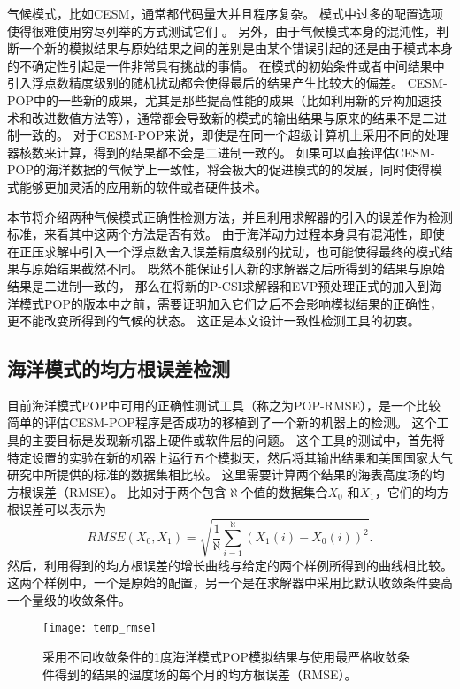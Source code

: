   
气候模式，比如CESM，通常都代码量大并且程序复杂。 
模式中过多的配置选项使得很难使用穷尽列举的方式测试它们 \cite{clune2011, pipitone2012}。 
另外，由于气候模式本身的混沌性，判断一个新的模拟结果与原始结果之间的差别是由某个错误引起的还是由于模式本身的不确定性引起是一件非常具有挑战的事情。 
在模式的初始条件或者中间结果中引入浮点数精度级别的随机扰动都会使得最后的结果产生比较大的偏差。
CESM-POP中的一些新的成果，尤其是那些提高性能的成果（比如利用新的异构加速技术和改进数值方法等），通常都会导致新的模式的输出结果与原来的结果不是二进制一致的。 
对于CESM-POP来说，即使是在同一个超级计算机上采用不同的处理器核数来计算，得到的结果都不会是二进制一致的。 
如果可以直接评估CESM-POP的海洋数据的气候学上一致性，将会极大的促进模式的的发展，同时使得模式能够更加灵活的应用新的软件或者硬件技术。 

本节将介绍两种气候模式正确性检测方法，并且利用求解器的引入的误差作为检测标准，来看其中这两个方法是否有效。
由于海洋动力过程本身具有混沌性，即使在正压求解中引入一个浮点数舍入误差精度级别的扰动，也可能使得最终的模式结果与原始结果截然不同。 
既然不能保证引入新的求解器之后所得到的结果与原始结果是二进制一致的，
那么在将新的P-CSI求解器和EVP预处理正式的加入到海洋模式POP的版本中之前，需要证明加入它们之后不会影响模拟结果的正确性，更不能改变所得到的气候的状态。
这正是本文设计一致性检测工具的初衷。 


\subsection{海洋模式的均方根误差检测}
\label{verify:premethod}
 

目前海洋模式POP中可用的正确性测试工具（称之为POP-RMSE），是一个比较简单的评估CESM-POP程序是否成功的移植到了一个新的机器上的检测。 
这个工具的主要目标是发现新机器上硬件或软件层的问题。 
这个工具的测试中，首先将特定设置的实验在新的机器上运行五个模拟天，然后将其输出结果和美国国家大气研究中所提供的标准的数据集相比较。
这里需要计算两个结果的海表高度场的均方根误差（RMSE）。 
比如对于两个包含$\aleph$个值的数据集合$X_0$ 和$X_1$，它们的均方根误差可以表示为
 \begin{equation*}
 RMSE(X_0, X_1) = \sqrt{\frac{1}{\aleph}\sum_{i=1}^\aleph(X_1(i)-X_0(i))^2}.
 \end{equation*}
然后，利用得到的均方根误差的增长曲线与给定的两个样例所得到的曲线相比较。 
这两个样例中，一个是原始的配置，另一个是在求解器中采用比默认收敛条件要高一个量级的收敛条件。 


\begin{figure}%
\begin{center}
\texttt{[image: temp\_rmse]}
\end{center}
\caption[] {采用不同收敛条件的1度海洋模式POP模拟结果与使用最严格收敛条件得到的结果的温度场的每个月的均方根误差（RMSE）。}
\label{fig:ssh_rmse_t}
\end{figure}

